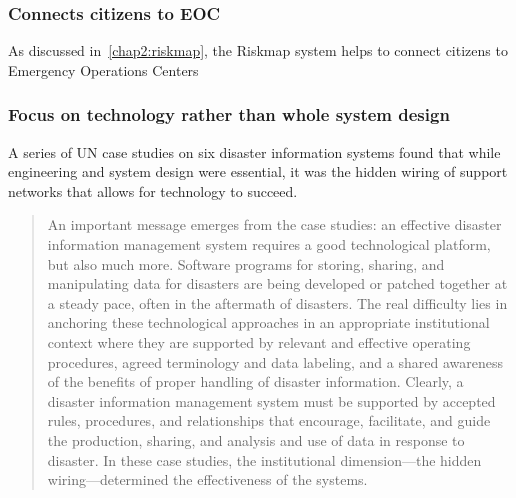 \subsubsection{Connects citizens to EOC}
As discussed in~\ref{chap2:riskmap}, the Riskmap system helps to connect
citizens to Emergency Operations Centers

\subsubsection{Focus on technology rather than whole system design}
A series of UN case studies on six disaster information systems found that while
engineering and system design were essential, it was the hidden wiring of support
networks that allows for technology to succeed.

\begin{quote}
An important message emerges from the case studies: an effective disaster
information management system requires a good technological platform,
but also much more. Software programs for storing, sharing, and manipulating
data for disasters are being developed or patched together at a steady pace,
often in the aftermath of disasters. The real difficulty lies in anchoring
these technological approaches in an appropriate institutional context where
they are supported by relevant and effective operating procedures, agreed
terminology and data labeling, and a shared awareness of the benefits of proper
handling of disaster information. Clearly, a disaster information management
system must be supported by accepted rules, procedures, and relationships
that encourage, facilitate, and guide the production, sharing, and analysis and
use of data in response to disaster. In these case studies, the institutional
dimension---the hidden wiring---determined the effectiveness of the
systems.~\cite{aminDataNaturalDisasters2008}
\end{quote}

